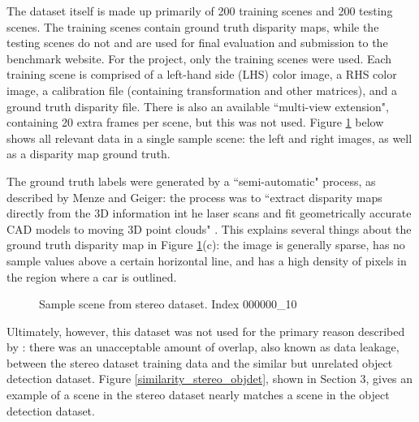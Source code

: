 The dataset itself is made up primarily of 200 training scenes and 200 testing scenes. The training scenes contain ground truth disparity maps, while the testing scenes do not and are used for final evaluation and submission to the benchmark website. For the project, only the training scenes were used. Each training scene is comprised of a left-hand side (LHS) color image, a RHS color image, a calibration file (containing transformation and other matrices), and a ground truth disparity file. There is also an available ``multi-view extension", containing 20 extra frames per scene, but this was not used. Figure \ref{stereo_sample} below shows all relevant data in a single sample scene: the left and right images, as well as a disparity map ground truth.

The ground truth labels were generated by a ``semi-automatic" process, as described by Menze and Geiger: the process was to ``extract disparity maps directly from the 3D information int he laser scans and fit geometrically accurate CAD models to moving 3D point clouds" \cite{menze_object_2015}. This explains several things about the ground truth disparity map in Figure \ref{stereo_sample}(c): the image is generally sparse, has no sample values above a certain horizontal line, and has a high density of pixels in the region where a car is outlined.

\begin{figure}[H]
    \centering
    \caption{Sample scene from stereo dataset. Index 000000\_10}
    \label{stereo_sample}
\end{figure}



Ultimately, however, this dataset was not used for the primary reason described by \cite{wang_pseudo-lidar_2019}: there was an unacceptable amount of overlap, also known as data leakage, between the stereo dataset training data and the similar but unrelated object detection dataset. Figure \ref{similarity_stereo_objdet}, shown in Section 3, gives an example of a scene in the stereo dataset nearly matches a scene in the object detection dataset.

